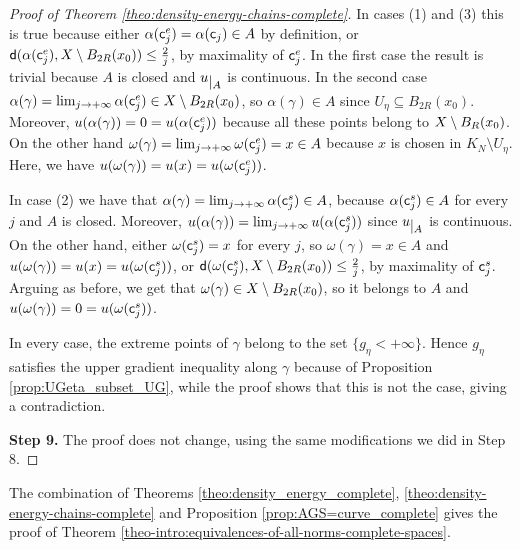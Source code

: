 \documentclass[12pt]{amsart}
\newcommand{\sfd}{{\sf d}}
\newcommand{\restr}[1]{\lower3pt\hbox{$|_{#1}$}}
\newcommand{\X}{{\rm X}}
\theoremstyle{definition}
\newcommand{\sfc}{{\sf c}}
\begin{document}
\begin{proof}[Proof of Theorem \ref{theo:density-energy-chains-complete}]
    In cases (1) and (3) this is true because either $\alpha(\sfc_j^e) = \alpha(\sfc_j) \in A$ by definition, or $\sfd(\alpha(\sfc_j^e), \X \setminus B_{2R}(x_0)) \le \frac{2}{j}$, by maximality of $\sfc_j^e$. In the first case the result is trivial because $A$ is closed and $u\restr{A}$ is continuous. In the second case $\alpha(\gamma) = \lim_{j\to +\infty} \alpha(\sfc_j^e) \in \X \setminus B_{2R}(x_0)$, so $\alpha(\gamma)\in A$ since $U_\eta \subseteq B_{2R}(x_0)$. Moreover, $u(\alpha(\gamma)) = 0 = u(\alpha(\sfc_j^e))$ because all these points belong to $\X \setminus B_R(x_0)$. On the other hand $\omega(\gamma) = \lim_{j\to +\infty} \omega(\sfc_j^e) = x \in A$ because $x$ is chosen in $K_N\setminus U_\eta$. Here, we have $u(\omega(\gamma)) = u(x) = u(\omega(\sfc_j^e))$.   
    
    In case (2) we have that $\alpha(\gamma) = \lim_{j\to +\infty} \alpha(\sfc_j^s) \in A$, because $\alpha(\sfc_j^s) \in A$ for every $j$ and $A$ is closed. Moreover, $u(\alpha(\gamma)) = \lim_{j\to +\infty} u(\alpha(\sfc_j^s))$ since $u\restr{A}$ is continuous. On the other hand, either $\omega(\sfc_j^s) = x$ for every $j$, so $\omega(\gamma) = x \in A$ and $u(\omega(\gamma)) = u(x) = u(\omega(\sfc_j^s))$, or $\sfd(\omega(\sfc_j^s), \X \setminus B_{2R}(x_0)) \le \frac{2}{j}$, by maximality of $\sfc_j^s$. Arguing as before, we get that $\omega(\gamma) \in \X \setminus B_{2R}(x_0)$, so it belongs to $A$ and $u(\omega(\gamma)) = 0 = u(\omega(\sfc_j^s))$. 
    
    In every case, the extreme points of $\gamma$ belong to the set $\{g_\eta < +\infty\}$. Hence $g_\eta$ satisfies the upper gradient inequality along $\gamma$ because of Proposition \ref{prop:UGeta_subset_UG}, while the proof shows that this is not the case, giving a contradiction.

    {\bf Step 9.} The proof does not change, using the same modifications we did in Step 8.
\end{proof}
%
    The combination of Theorems \ref{theo:density_energy_complete}, \ref{theo:density-energy-chains-complete} and Proposition \ref{prop:AGS=curve_complete} gives the proof of Theorem \ref{theo-intro:equivalences-of-all-norms-complete-spaces}.
\end{document}
